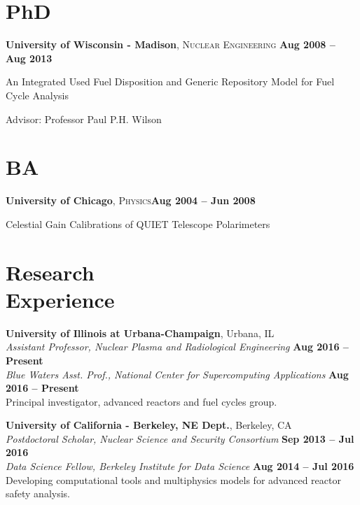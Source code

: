 \documentclass[margin,line]{resume}
\begin{document}
\begin{resume}
    \section{\mysidestyle PhD}
    \textbf{University of Wisconsin - Madison}, \textsc{Nuclear Engineering}\hfill \textbf{ Aug 2008 -- Aug 2013}\vspace{-3mm}\\\vspace{-1mm}%
    \begin{list2}
        \item An Integrated Used Fuel Disposition and Generic Repository Model for Fuel Cycle Analysis
        \item Advisor:  Professor Paul P.H. Wilson
    \end{list2}\vspace{-1.5mm}
    \section{\mysidestyle BA}
    \textbf{University of Chicago}, \textsc{Physics}\hfill\textbf{Aug 2004 -- Jun 2008}\vspace{-3mm}\\\vspace{-1mm}%
    \begin{list2}
	\item Celestial Gain Calibrations of QUIET Telescope Polarimeters
    \end{list2}\vspace{-1.5mm}
    \section{\mysidestyle Research\\Experience}
    \textbf{University of Illinois at Urbana-Champaign}, Urbana, IL\\
		\textsl{Assistant Professor, Nuclear Plasma and Radiological Engineering} \hfill \textbf{Aug 2016 -- Present}\\
		\textsl{Blue Waters Asst. Prof., National Center for Supercomputing Applications} \hfill \textbf{Aug 2016 -- Present}\\
                Principal investigator, advanced reactors and fuel cycles group.

    \textbf{University of California - Berkeley, NE Dept.}, Berkeley, CA \\
		\textsl{Postdoctoral Scholar, Nuclear Science and Security Consortium} \hfill \textbf{Sep 2013 -- Jul 2016}\\
		\textsl{Data Science Fellow, Berkeley Institute for Data Science} \hfill \textbf{Aug 2014 -- Jul 2016}\\
                Developing computational tools and multiphysics models for advanced reactor safety analysis.


\end{resume}
\end{document}
